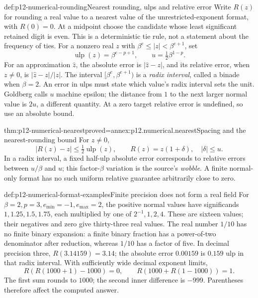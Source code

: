 \begin{hbdefinition}{def:p12-numerical-rounding}{Nearest rounding, ulps and relative error}
Write \(R(z)\) for rounding a real value to a nearest value of the
unrestricted-exponent format, with \(R(0)=0\). At a midpoint choose the
candidate whose least significant retained digit is even. This is a
deterministic tie rule, not a statement about the frequency of ties.
For a nonzero real \(z\) with \(\beta^e\leq |z|<\beta^{e+1}\), set
\[
 \operatorname{ulp}(z)=\beta^{e-p+1},\qquad
 u=\tfrac12\beta^{1-p}.
\]
For an approximation \(\widehat z\), the absolute error is
\(|\widehat z-z|\), and its relative error, when \(z\ne0\), is
\(|\widehat z-z|/|z|\). The interval
\([\beta^e,\beta^{e+1})\) is a \emph{radix interval}, called a
binade when \(\beta=2\). An error in ulps must state which value's radix interval
sets the unit. Goldberg calls \(u\) machine epsilon; the distance from
\(1\) to the next larger normal value is \(2u\), a different quantity.
At a zero target relative error is undefined, so use an absolute bound.
\end{hbdefinition}

\begin{hbtheorem}{thm:p12-numerical-nearest}{proved=annex:p12.numerical.nearest}{Spacing and the nearest-rounding bound}
For \(z\ne0\),
\[
 |R(z)-z|\leq\tfrac12\operatorname{ulp}(z),\qquad
 R(z)=z(1+\delta),\quad |\delta|\leq u.
\]
In a radix interval, a fixed half-ulp absolute error corresponds to relative
errors between \(u/\beta\) and \(u\); this factor-\(\beta\) variation
is the source's \emph{wobble}. A finite normal-only format has no such
uniform relative guarantee arbitrarily close to zero.
\end{hbtheorem}

\begin{hbexample}{def:p12-numerical-format-examples}{Finite precision does not form a real field}
For \(\beta=2,p=3,e_{\min}=-1,e_{\max}=2\), the positive normal
values have significands \(1,1.25,1.5,1.75\), each multiplied by one of
\(2^{-1},1,2,4\). These are sixteen values; their negatives and zero
give thirty-three real values. The real number \(1/10\) has no finite
binary expansion: a finite binary fraction has a power-of-two denominator
after reduction, whereas \(1/10\) has a factor of five.
In decimal precision three, \(R(3.14159)=3.14\); the absolute error
\(0.00159\) is \(0.159\) ulp in that radix interval.
With sufficiently wide decimal exponent limits,
\[
 R(R(1000+1)-1000)=0,\qquad R(1000+R(1-1000))=1.
\]
The first sum rounds to \(1000\); the second inner difference is
\(-999\). Parentheses therefore affect the computed answer.
\end{hbexample}

